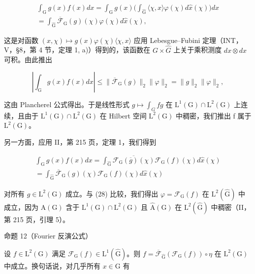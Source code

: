 \[
\begin{array}{r} \int_ {\mathrm{G}} g (x) f (x) d x = \int_ {\mathrm{G}} g (x) \Big (\int_ {\widehat {\mathrm{G}}} \langle \chi , x \rangle \varphi (\chi) d \widehat {x} (\chi) \Big) d x \\ = \int_ {\widehat {\mathrm{G}}} \overline {{\mathcal {F}}} _ {\mathrm{G}} (g) (\chi) \varphi (\chi) d \widehat {x} (\chi), \end{array}\tag{28}
\]

这是对函数 \((x,\chi)\mapsto g(x)\varphi(\chi)\langle\chi,x\rangle\) 应用 Lebesgue–Fubini 定理（INT，V，§8，第 4 节，定理 1, a)）得到的，该函数在 \(G\times\widehat{G}\) 上关于乘积测度 \(dx\otimes d\widehat{x}\) 可积。由此推出

\[
\left| \int_ {\mathrm{G}} g (x) f (x) d x \right| \leqslant \| \overline {{{\mathcal {F}}}} _ {\mathrm{G}} (g) \| _ {2} \| \varphi \| _ {2} = \| g \| _ {2} \| \varphi \| _ {2},
\]

这由 Plancherel 公式得出。于是线性形式 \(g \mapsto \int_{G} fg\) 在 \(\mathrm{L}^{1}(\mathrm{G}) \cap \mathrm{L}^{2}(\mathrm{G})\) 上连续，且由于 \(\mathrm{L}^{1}(\mathrm{G}) \cap \mathrm{L}^{2}(\mathrm{G})\) 在 Hilbert 空间 \(\mathrm{L}^{2}(\mathrm{G})\) 中稠密，我们推出 f 属于 \(\mathrm{L}^{2}(\mathrm{G})\)。

另一方面，应用 II，第 215 页，定理 1，我们得到

\[
\begin{array}{r} \int_ {\mathrm{G}} g (x) f (x) d x = \int_ {\widehat {\mathrm{G}}} \overline {{\mathcal {F} _ {\mathrm{G}} (\overline {{g}}) (\chi)}} \mathcal {F} _ {\mathrm{G}} (f) (\chi) d \widehat {x} (\chi) \\ = \int_ {\widehat {\mathrm{G}}} \overline {{\mathcal {F}}} _ {\mathrm{G}} (g) (\chi) \mathcal {F} _ {\mathrm{G}} (f) (\chi) d \widehat {x} (\chi) \end{array}
\]

对所有 \(g \in \mathrm{L}^{2}(\mathrm{G})\) 成立。与 (28) 比较，我们得出 \(\varphi = \mathcal{F}_{\mathrm{G}}(f)\) 在 \(\mathrm{L}^{2}(\widehat{\mathrm{G}})\) 中成立，因为 \(\mathrm{A}(\mathrm{G})\) 含于 \(\mathrm{L}^{1}(\mathrm{G}) \cap \mathrm{L}^{2}(\mathrm{G})\) 且 \(\widehat{\mathrm{A}}(\mathrm{G})\) 在 \(\mathrm{L}^{2}(\widehat{\mathrm{G}})\) 中稠密（II，第 215 页，引理 5）。

命题 12（Fourier 反演公式）

设 \(f \in \mathrm{L}^2(\mathrm{G})\) 满足 \(\mathcal{F}_{\mathrm{G}}(f) \in \mathrm{L}^1(\widehat{\mathrm{G}})\)。则 \(f = \overline{\mathcal{F}}_{\widehat{\mathrm{G}}}(\mathcal{F}_{\mathrm{G}}(f)) \circ \eta\) 在 \(\mathrm{L}^2(\mathrm{G})\) 中成立。换句话说，对几乎所有 \(x \in \mathrm{G}\) 有

